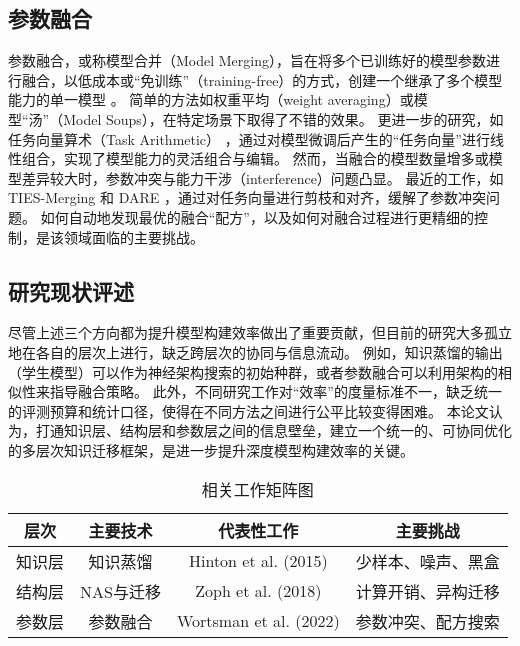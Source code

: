 \subsection[\hspace{-2pt}参数融合]{{\heiti{} \hspace{-8pt}参数融合}}
参数融合，或称模型合并（Model Merging），旨在将多个已训练好的模型参数进行融合，以低成本或“免训练”（training-free）的方式，创建一个继承了多个模型能力的单一模型 \cite{wortsman2022model_soup}。
简单的方法如权重平均（weight averaging）或模型“汤”（Model Soups），在特定场景下取得了不错的效果。
更进一步的研究，如任务向量算术（Task Arithmetic） \cite{ilharco2022task_arithmetic}，通过对模型微调后产生的“任务向量”进行线性组合，实现了模型能力的灵活组合与编辑。
然而，当融合的模型数量增多或模型差异较大时，参数冲突与能力干涉（interference）问题凸显。
最近的工作，如TIES-Merging \cite{yadav2023ties_merging} 和 DARE \cite{yu2023dare}，通过对任务向量进行剪枝和对齐，缓解了参数冲突问题。
如何自动地发现最优的融合“配方”，以及如何对融合过程进行更精细的控制，是该领域面临的主要挑战。

\subsection[\hspace{-2pt}研究现状评述]{{\heiti{} \hspace{-8pt}研究现状评述}}
尽管上述三个方向都为提升模型构建效率做出了重要贡献，但目前的研究大多孤立地在各自的层次上进行，缺乏跨层次的协同与信息流动。
例如，知识蒸馏的输出（学生模型）可以作为神经架构搜索的初始种群，或者参数融合可以利用架构的相似性来指导融合策略。
此外，不同研究工作对“效率”的度量标准不一，缺乏统一的评测预算和统计口径，使得在不同方法之间进行公平比较变得困难。
本论文认为，打通知识层、结构层和参数层之间的信息壁垒，建立一个统一的、可协同优化的多层次知识迁移框架，是进一步提升深度模型构建效率的关键。

\begin{table}[htbp]
	\centering
	\caption{相关工作矩阵图}
	\label{tab:RelatedWork_Map}
	\begin{tabular}{|c|c|c|c|}
		\hline
		\textbf{层次} & \textbf{主要技术} & \textbf{代表性工作}         & \textbf{主要挑战} \\
		\hline
		知识层         & 知识蒸馏          & Hinton et al. (2015)   & 少样本、噪声、黑盒     \\
		\hline
		结构层         & NAS与迁移        & Zoph et al. (2018)     & 计算开销、异构迁移     \\
		\hline
		参数层         & 参数融合          & Wortsman et al. (2022) & 参数冲突、配方搜索     \\
		\hline
	\end{tabular}
\end{table}

